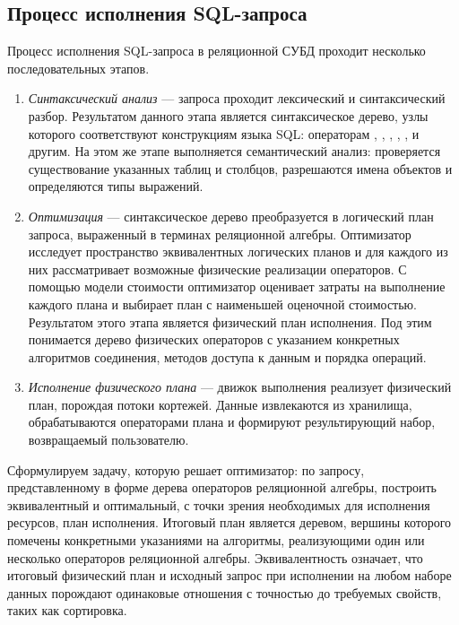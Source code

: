 \documentclass[fontsize=14pt, russian]{scrartcl}
\begin{document}
\subsection{Процесс исполнения SQL-запроса}

Процесс исполнения SQL-запроса в реляционной СУБД проходит несколько
последовательных этапов.

\begin{enumerate}
  \item \emph{Синтаксический анализ} --- запроса проходит лексический и
        синтаксический разбор. Результатом данного этапа является синтаксическое
        дерево, узлы которого соответствуют конструкциям языка SQL: операторам
        \SELECT, \FROM, \WHERE, \JOIN, \GROUPBY, \ORDERBY{} и другим. На этом же
        этапе выполняется семантический анализ: проверяется существование
        указанных таблиц и столбцов, разрешаются имена объектов и определяются
        типы выражений.

  \item \emph{Оптимизация} --- синтаксическое дерево преобразуется в логический
        план запроса, выраженный в терминах реляционной алгебры. Оптимизатор
        исследует пространство эквивалентных логических планов и для каждого из
        них рассматривает возможные физические реализации операторов. С помощью
        модели стоимости оптимизатор оценивает затраты на выполнение каждого
        плана и выбирает план с наименьшей оценочной стоимостью. Результатом
        этого этапа является физический план исполнения. Под этим понимается
        дерево физических операторов с указанием конкретных алгоритмов
        соединения, методов доступа к данным и порядка операций.

  \item \emph{Исполнение физического плана} --- движок выполнения реализует
        физический план, порождая потоки кортежей. Данные извлекаются из
        хранилища, обрабатываются операторами плана и формируют результирующий
        набор, возвращаемый пользователю.
\end{enumerate}


Сформулируем задачу, которую решает оптимизатор: по запросу, представленному в
форме дерева операторов реляционной алгебры, построить эквивалентный и
оптимальный, с точки зрения необходимых для исполнения ресурсов, план
исполнения. Итоговый план является деревом, вершины которого помечены
конкретными указаниями на алгоритмы, реализующими один или несколько операторов
реляционной алгебры. Эквивалентность означает, что итоговый физический план и
исходный запрос при исполнении на любом наборе данных порождают одинаковые
отношения с точностью до требуемых свойств, таких как сортировка.
\end{document}
